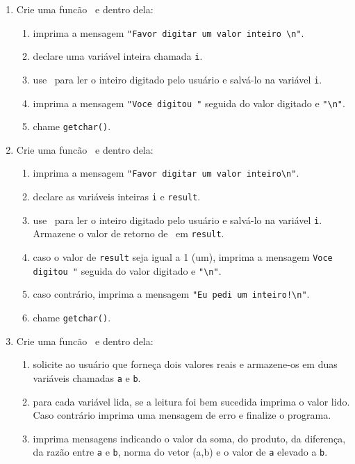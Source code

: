 \begin{enumerate}

  \item Crie uma funcão \MAIN\ e dentro dela:
    \begin{enumerate}
      \item imprima a mensagem \verb|"Favor digitar um valor inteiro \n"|.
      \item declare uma variável inteira chamada {\tt i}.
      \item use \SCANF\ para ler o inteiro digitado pelo usuário e salvá-lo na variável {\tt i}.
      \item imprima a mensagem \verb|"Voce digitou "| seguida do valor digitado e \verb|"\n"|.
      \item chame \verb|getchar()|.
    \end{enumerate}

  \item Crie uma funcão \MAIN\ e dentro dela:
    \begin{enumerate}
      \item imprima a mensagem \verb|"Favor digitar um valor inteiro\n"|.
      \item declare as variáveis inteiras {\tt i} e {\tt result}.
      \item use \SCANF\ para ler o inteiro digitado pelo usuário e salvá-lo na variável {\tt i}. Armazene o valor de retorno de \SCANF\ em {\tt result}.
      \item caso o valor de {\tt result} seja igual a 1 (um), imprima a mensagem \verb|Voce digitou "| seguida do valor digitado e \verb|"\n"|.
      \item caso contrário, imprima a mensagem \verb|"Eu pedi um inteiro!\n"|.
      \item chame \verb|getchar()|.
    \end{enumerate}

  \item Crie uma funcão \MAIN\ e dentro dela:
    \begin{enumerate}
      \item solicite ao usuário que forneça dois valores reais e armazene-os em duas variáveis chamadas {\tt a} e {\tt b}.
      \item para cada variável lida, se a leitura foi bem sucedida imprima o valor lido. Caso contrário imprima uma mensagem de erro e finalize o programa.
      \item imprima mensagens indicando o valor da soma, do produto, da diferença, da razão entre {\tt a} e {\tt b}, norma do vetor (a,b) e o valor de {\tt a} elevado a {\tt b}.
    \end{enumerate}


\end{enumerate}
